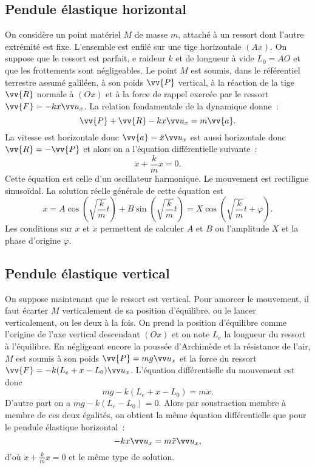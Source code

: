 \subsection{Pendule élastique horizontal}
\label{chap3-subsec:pendulehorizontal}
On considère un point matériel \(M\) de masse \(m\), attaché à un ressort dont l'autre extrémité est fixe. L'ensemble est enfilé sur une tige horizontale \((Ax)\). On suppose que le ressort est parfait, e raideur \(k\) et de longueur à vide \(L_0=AO\) et que les frottements sont négligeables. Le point \(M\) est soumis, dans le référentiel terrestre assumé galiléen, à son poids \(\vv{P}\) vertical, à la réaction de la tige \(\vv{R}\) normale à \((Ox)\) et à la force de rappel exercée par le ressort \(\vv{F}=-kx\ux\). La relation fondamentale de la dynamique donne~:
\begin{equation}
  \vv{P}+\vv{R}-kx\ux = m\vv{a}.
\end{equation}
La vitesse est horizontale donc \(\vv{a} = \ddot{x}\ux\) est aussi horizontale donc \(\vv{R}=-\vv{P}\) et alors on a l'équation différentielle suivante~:
\begin{equation}
  \ddot{x} +\frac{k}{m}x=0.
\end{equation}
Cette équation est celle d'un oscillateur harmonique. Le mouvement est rectiligne sinusoïdal. La solution réelle générale de cette équation est
\begin{equation}
  x = A \cos\left(\sqrt{\frac{k}{m}} t\right) + B \sin\left(\sqrt{\frac{k}{m}} t\right) = X \cos\left(\sqrt{\frac{k}{m}} t + \varphi\right).
\end{equation}
Les conditions sur \(x\) et \(\dot{x}\) permettent de calculer \(A\) et \(B\) ou l'amplitude \(X\) et la phase d'origine \(\varphi\).

\subsection{Pendule élastique vertical}
\label{chap3-subsec:pendulevertical}
On suppose maintenant que le ressort est vertical. Pour amorcer le mouvement, il faut écarter \(M\) verticalement de sa position d'équilibre, ou le lancer verticalement, ou les deux à la fois. On prend la position d'équilibre comme l'origine de l'axe vertical descendant \((Ox)\) et on note \(L_e\) la longueur du ressort à l'équilibre. En négligeant encore la poussée d'Archimède et la résistance de l'air, \(M\) est soumis à son poids \(\vv{P}=mg\ux\) et la force du ressort \(\vv{F}=-k(L_e +x-L_0)\ux\). L'équation différentielle du mouvement est donc
\begin{equation}
  mg -k(L_e +x-L_0) = m\ddot{x}.
\end{equation}
D'autre part on a \( mg-k(L_e-L_0)=0\). Alors par soustraction membre à membre de ces deux égalités, on obtient la même équation différentielle que pour le pendule élastique horizontal~:
\begin{equation}
  -kx \ux = m \ddot{x} \ux,
\end{equation}
d'où \(\ddot{x} +\frac{k}{m}x=0\) et le même type de solution.

